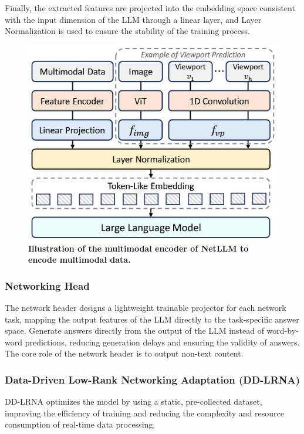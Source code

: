 \documentclass[twocolumn]{article}
\begin{document}
Finally, the extracted features are projected into the embedding space consistent with the input dimension of the LLM through a linear layer, and Layer Normalization is used to ensure the stability of the training process.

\begin{figure}[t]
  \centering
  \includegraphics[width=1\linewidth]{img/figure9.jpg}
  \caption{\textbf{Illustration of the multimodal encoder of NetLLM to encode multimodal data.}}
  \label{fig:8}
\end{figure}

\subsubsection{Networking Head}
The network header designs a lightweight trainable projector for each network task, mapping the output features of the LLM directly to the task-specific answer space. Generate answers directly from the output of the LLM instead of word-by-word predictions, reducing generation delays and ensuring the validity of answers. The core role of the network header is to output non-text content.

\subsubsection{Data-Driven Low-Rank Networking Adaptation (DD-LRNA)}
DD-LRNA optimizes the model by using a static, pre-collected dataset, improving the efficiency of training and reducing the complexity and resource consumption of real-time data processing.
\end{document}
